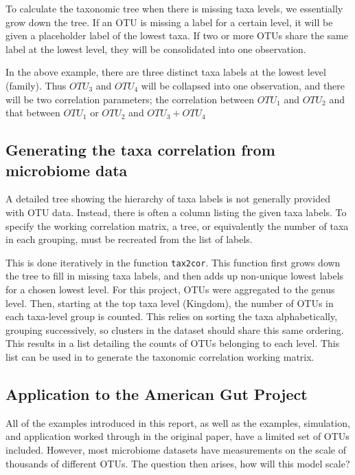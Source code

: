 \documentclass[12pt]{article}
\begin{document}
To calculate the taxonomic tree when there is missing taxa levels, we essentially grow down the tree. If an OTU is missing a label for a certain level, it will be given a placeholder label of the lowest taxa. If two or more OTUs share the same label at the lowest level, they will be consolidated into one observation.

In the above example, there are three distinct taxa labels at the lowest level (family). Thus $OTU_3$ and $OTU_4$ will be collapsed into one observation, and there will be two correlation parameters; the correlation between $OTU_1$ and $OTU_2$ and that between $OTU_1$ or $OTU_2$ and $OTU_3 + OTU_4$

\subsection{Generating the taxa correlation from microbiome data}

A detailed tree showing the hierarchy of taxa labels is not generally provided with OTU data. Instead, there is often a column listing the given taxa labels. To specify the working correlation matrix, a tree, or equivalently the number of taxa in each grouping, must be recreated from the list of labels.

This is done iteratively in the function \texttt{tax2cor}. This function first grows down the tree to fill in missing taxa labels, and then adds up non-unique lowest labels for a chosen lowest level. For this project, OTUs were aggregated to the genus level. Then, starting at the top taxa level (Kingdom), the number of OTUs in each taxa-level group is counted. This relies on sorting the taxa alphabetically, grouping successively, so clusters in the dataset should share this same ordering. This results in a list detailing the counts of OTUs belonging to each level. This list can be used in to generate the taxonomic correlation working matrix.



\subsection{Application to the American Gut Project}

All of the examples introduced in this report, as well as the examples, simulation, and application worked through in the original paper, have a limited set of OTUs included. However, most microbiome datasets have measurements on the scale of thousands of different OTUs. The question then arises, how will this model scale?
\end{document}
